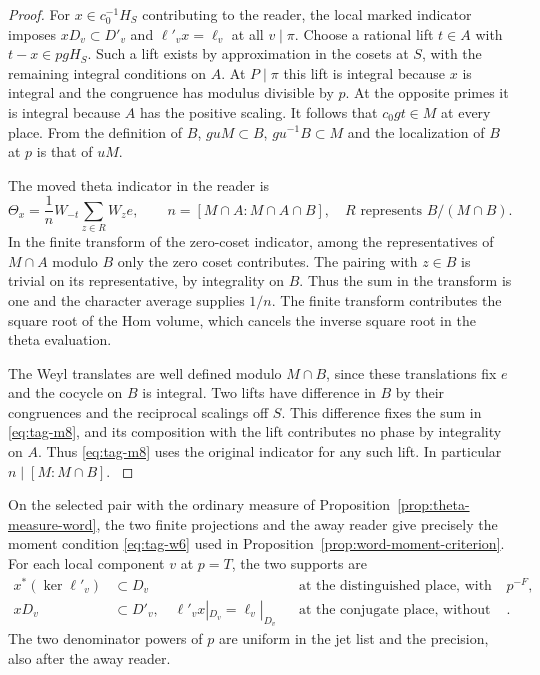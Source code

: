 \begin{proof}

For \(x\in c_0^{-1}H_S\) contributing to the reader,
the local marked indicator imposes
\(xD_v\subset D'_v\) and \(\ell'_v x=\ell_v\)
at all \(v\mid\pi\). Choose a rational lift \(t\in A\)
with \(t-x\in pgH_S\). Such a lift exists by
approximation in the cosets at \(S\), with the remaining
integral conditions on \(A\). At \(P\mid\pi\) this lift is
integral because \(x\) is integral and the congruence
has modulus divisible by \(p\). At the opposite primes
it is integral because \(A\) has the positive scaling.
It follows that \(c_0gt\in M\) at every place. From the
definition of \(B\), \(g uM\subset B\), \(g u^{-1}B\subset M\)
and the localization of \(B\) at \(p\) is that of \(uM\).


The moved theta indicator in the reader is
\[
             \Theta_x=\frac1n W_{-t}\sum_{z\in R}W_z e ,
\qquad
        n=[M\cap A:M\cap A\cap B],\quad
        R\text{ represents }B/(M\cap B).
\tag{M8}\label{eq:tag-m8}
\]
In the finite transform of the zero-coset indicator, among
the representatives of \(M\cap A\) modulo \(B\) only the
zero coset contributes. The pairing with \(z\in B\) is
trivial on its representative, by integrality on \(B\).
Thus the sum in the transform is one and the character
average supplies \(1/n\).
The finite transform contributes the square root of the
Hom volume, which cancels the inverse square root in
the theta evaluation.

The Weyl translates
are well defined modulo \(M\cap B\), since these
translations fix \(e\) and the cocycle on \(B\) is
integral. Two lifts have difference in \(B\) by their
congruences and the reciprocal scalings off \(S\).
This difference fixes the sum in \eqref{eq:tag-m8}, and its
composition with the lift contributes no phase by
integrality on \(A\). Thus \eqref{eq:tag-m8} uses the original
indicator for any such lift. In particular
\(n\mid[M:M\cap B]\).
\label{cor:word-projection-1}

\end{proof}

\begin{proposition}\label{prop:word-projection-moments}
On the selected pair with the ordinary measure of
Proposition~\ref{prop:theta-measure-word}, the two finite
projections and the away reader give precisely the moment
condition \eqref{eq:tag-w6} used in Proposition~\ref{prop:word-moment-criterion}.
For each local component \(v\) at \(p=T\), the two supports are
\[
 \begin{aligned}
 x^*(\ker\ell'_v)&\subset D_v
   &&\text{at the distinguished place, with factor }p^{-F},\\
 xD_v&\subset D'_v,\quad \ell'_v x|_{D_v}=\ell_v|_{D_v}
   &&\text{at the conjugate place, without that factor}.
 \end{aligned}
\]
The two
denominator powers of \(p\) are uniform in the jet list
and the precision, also after the away reader.
\end{proposition}

